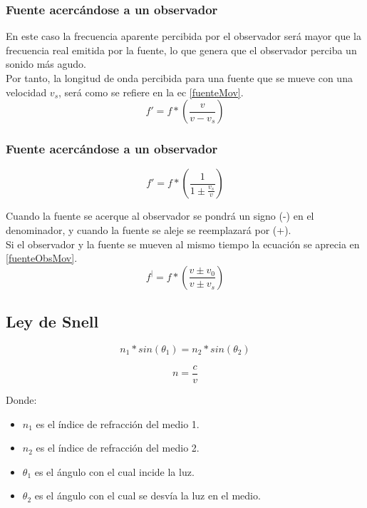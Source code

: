 \documentclass[]{article}
\begin{document}
\subsubsection{Fuente acercándose a un observador}
En este caso la frecuencia aparente percibida por el observador será mayor que la frecuencia real emitida por la fuente, lo que genera que el observador perciba un sonido más agudo.\\

Por tanto, la longitud de onda percibida para una fuente que se mueve con una velocidad $v_s$, será como se refiere en la ec \ref{fuenteMov}.\\

\begin{equation}
f'=f*(\frac{v}{v-v_s})
\label{fuenteMov}
\end{equation}

\subsubsection{Fuente acercándose a un observador}

\begin{equation}
f'=f*(\frac{1}{1 \pm \frac{v_s}{v}})
\end{equation}

Cuando la fuente se acerque al observador se pondrá un signo (-) en el denominador, y cuando la fuente se aleje se reemplazará por (+).\\
Si el observador y la fuente se mueven al mismo tiempo la ecuación se aprecia en \ref{fuenteObsMov}.\\

\begin{equation}
f^|=f*(\frac{v \pm v_0}{v \pm v_s})
\label{fuenteObsMov}
\end{equation}

\subsection{Ley de Snell}
\begin{equation}
n_1*sin(\theta_1)=n_2*sin(\theta_2)
\end{equation}

\begin{equation}
n=\frac{c}{v}
\end{equation}

Donde:\\

\begin{itemize}
	\item $n_1$ es el índice de refracción del medio 1.
	\item $n_2$ es el índice de refracción del medio 2.
	\item $\theta_1$ es el ángulo con el cual incide la luz.
	\item $\theta_2$ es el ángulo con el cual se desvía la luz en el medio.
\end{itemize}
\end{document}
